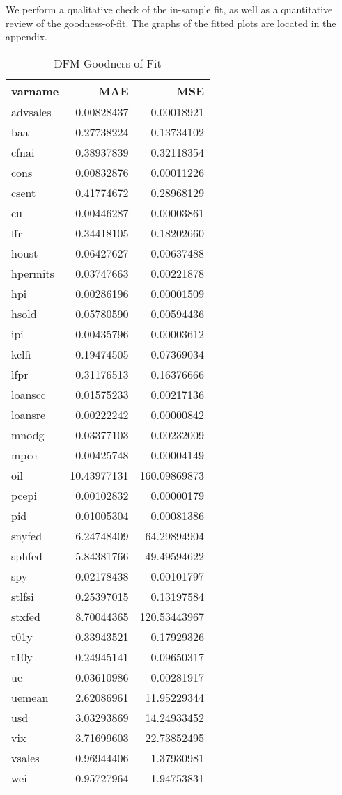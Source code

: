 \documentclass[11pt, letterpaper]{article}\usepackage[]{graphicx}\usepackage[]{color}
\begin{document}
We perform a qualitative check of the in-sample fit, as well as a quantitative review of the goodness-of-fit. The graphs of the fitted plots are located in the appendix.
\begin{table}[H]
\centering
\begingroup\footnotesize
\begin{tabular}{lrr}
  \hline
varname & MAE & MSE \\ 
  \hline
advsales & 0.00828437 & 0.00018921 \\ 
  baa & 0.27738224 & 0.13734102 \\ 
  cfnai & 0.38937839 & 0.32118354 \\ 
  cons & 0.00832876 & 0.00011226 \\ 
  csent & 0.41774672 & 0.28968129 \\ 
  cu & 0.00446287 & 0.00003861 \\ 
  ffr & 0.34418105 & 0.18202660 \\ 
  houst & 0.06427627 & 0.00637488 \\ 
  hpermits & 0.03747663 & 0.00221878 \\ 
  hpi & 0.00286196 & 0.00001509 \\ 
  hsold & 0.05780590 & 0.00594436 \\ 
  ipi & 0.00435796 & 0.00003612 \\ 
  kclfi & 0.19474505 & 0.07369034 \\ 
  lfpr & 0.31176513 & 0.16376666 \\ 
  loanscc & 0.01575233 & 0.00217136 \\ 
  loansre & 0.00222242 & 0.00000842 \\ 
  mnodg & 0.03377103 & 0.00232009 \\ 
  mpce & 0.00425748 & 0.00004149 \\ 
  oil & 10.43977131 & 160.09869873 \\ 
  pcepi & 0.00102832 & 0.00000179 \\ 
  pid & 0.01005304 & 0.00081386 \\ 
  snyfed & 6.24748409 & 64.29894904 \\ 
  sphfed & 5.84381766 & 49.49594622 \\ 
  spy & 0.02178438 & 0.00101797 \\ 
  stlfsi & 0.25397015 & 0.13197584 \\ 
  stxfed & 8.70044365 & 120.53443967 \\ 
  t01y & 0.33943521 & 0.17929326 \\ 
  t10y & 0.24945141 & 0.09650317 \\ 
  ue & 0.03610986 & 0.00281917 \\ 
  uemean & 2.62086961 & 11.95229344 \\ 
  usd & 3.03293869 & 14.24933452 \\ 
  vix & 3.71699603 & 22.73852495 \\ 
  vsales & 0.96944406 & 1.37930981 \\ 
  wei & 0.95727964 & 1.94753831 \\ 
   \hline
\end{tabular}
\endgroup
\caption{DFM Goodness of Fit} 
\end{table}
\end{document}
